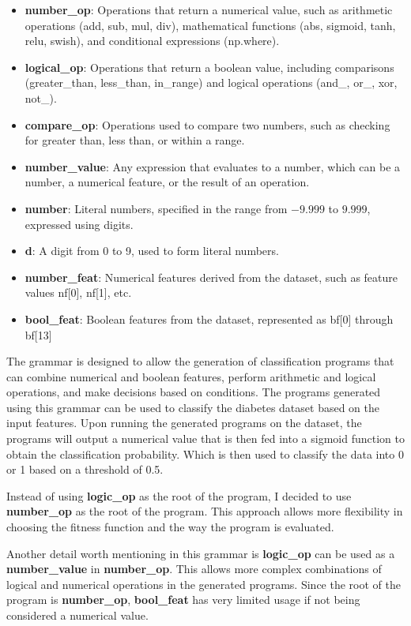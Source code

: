 \documentclass{article}
\begin{document}
    \begin{itemize} 
        \item \textbf{number\_op}: Operations that return a numerical value, such as arithmetic operations (add, sub, mul, div), mathematical functions (abs, sigmoid, tanh, relu, swish), and conditional expressions (np.where). 
        \item \textbf{logical\_op}: Operations that return a boolean value, including comparisons (greater\_than, less\_than, in\_range) and logical operations (and\_, or\_, xor, not\_). 
        \item \textbf{compare\_op}: Operations used to compare two numbers, such as checking for greater than, less than, or within a range. 
        \item \textbf{number\_value}: Any expression that evaluates to a number, which can be a number, a numerical feature, or the result of an operation. 
        \item \textbf{number}: Literal numbers, specified in the range from $-9.999$ to $9.999$, expressed using digits. 
        \item \textbf{d}: A digit from 0 to 9, used to form literal numbers. 
        \item \textbf{number\_feat}: Numerical features derived from the dataset, such as feature values nf[0], nf[1], etc. 
        \item \textbf{bool\_feat}: Boolean features from the dataset, represented as bf[0] through bf[13]
    \end{itemize}

    The grammar is designed to allow the generation of classification programs that can combine numerical and boolean features, perform arithmetic and logical operations, and make decisions based on conditions. 
    The programs generated using this grammar can be used to classify the diabetes dataset based on the input features.
    Upon running the generated programs on the dataset, the programs will output a numerical value that is then fed into a sigmoid function to obtain the classification probability.
    Which is then used to classify the data into 0 or 1 based on a threshold of 0.5.
    
    Instead of using \textbf{logic\_op} as the root of the program, I decided to use \textbf{number\_op} as the root of the program.
    This approach allows more flexibility in choosing the fitness function and the way the program is evaluated.

    Another detail worth mentioning in this grammar is \textbf{logic\_op} can be used as a \textbf{number\_value} in \textbf{number\_op}. 
    This allows more complex combinations of logical and numerical operations in the generated programs.
    Since the root of the program is \textbf{number\_op}, \textbf{bool\_feat} has very limited usage if not being considered a numerical value.
\end{document}
